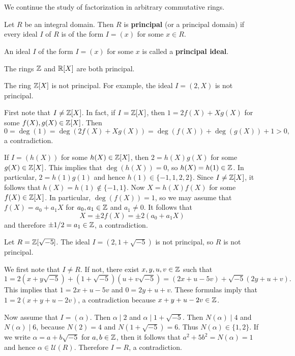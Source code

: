 \chapter{}

We continue the study of factorization in arbitrary commutative rings. 

\begin{definition}
	Let $R$ be an integral domain. Then $R$ is \textbf{principal} (or a principal domain) if
	every ideal $I$ of $R$ is of the form $I=(x)$ for some $x\in R$.   
\end{definition}

An ideal $I$ of the form $I=(x)$ for some $x$ is called a \textbf{principal ideal}. 

The rings $\mathbb{Z}$ and $\mathbb{R}[X]$ are both principal. 

\begin{example}
	The ring $\mathbb{Z}[X]$ is not principal. For example, the ideal
	$I=(2,X)$ is not principal. 
	
	First note that $I\ne\mathbb{Z}[X]$. In fact, if $I=\mathbb{Z}[X]$, then 
	$1=2f(X)+Xg(X)$ for some $f(X),g(X)\in\mathbb{Z}[X]$. Then
	\[
	0=\deg(1)=\deg(2f(X)+Xg(X))=\deg(f(X))+\deg(g(X))+1>0,
	\]	
	a contradiction. 
	
	If $I=(h(X))$ for some $h(X)\in\mathbb{Z}[X]$, then $2=h(X)g(X)$ for some $g(X)\in\mathbb{Z}[X]$. This
	implies that $\deg(h(X))=0$, so $h(X)=h(1)\in\mathbb{Z}$. In particular, $2=h(1)g(1)$ and hence
	$h(1)\in\{-1,1,2,2\}$. Since $I\ne\mathbb{Z}[X]$, it follows that $h(X)=h(1)\not\in\{-1,1\}$. Now      
	$X=h(X)f(X)$ for some $f(X)\in\mathbb{Z}[X]$. In particular, $\deg(f(X))=1$, so
	we may assume that $f(X)=a_0+a_1X$ for $a_0,a_1\in\mathbb{Z}$ and $a_1\ne 0$. 	
	It follows that 
	\[
	X=\pm 2f(X)=\pm2(a_0+a_1X)
	\]
	and therefore $\pm1/2=a_1\in\mathbb{Z}$, a contradiction.
\end{example}

\begin{example}
	Let $R=\mathbb{Z}[\sqrt{-5}]$.  
	The ideal $I=(2,1+\sqrt{-5})$ is not principal, so $R$ is not principal. 
	
	We first note that $I\ne R$. If not, there exist $x,y,u,v\in\mathbb{Z}$ such that 
	\[
	1=2(x+y\sqrt{-5})+(1+\sqrt{-5})(u+v\sqrt{-5})=(2x+u-5v)+\sqrt{-5}(2y+u+v).
	\]
	This implies that $1=2x+u-5v$ and $0=2y+u+v$. These formulas imply that
	$1=2(x+y+u-2v)$, a contradiction because $x+y+u-2v\in\mathbb{Z}$. 
	
	Now assume that $I=(\alpha)$. Then $\alpha\mid 2$ and $\alpha\mid 1+\sqrt{-5}$. Then
	$N(\alpha)\mid 4$ and $N(\alpha)\mid 6$, because $N(2)=4$ and $N(1+\sqrt{-5})=6$. 
	Thus $N(\alpha)\in\{1,2\}$. If we write
	$\alpha=a+b\sqrt{-5}$ for $a,b\in\mathbb{Z}$, then it follows that 
	$a^2+5b^2=N(\alpha)=1$ and hence $\alpha\in\mathcal{U}(R)$. 
	Therefore $I=R$, a contradiction.   
\end{example}

